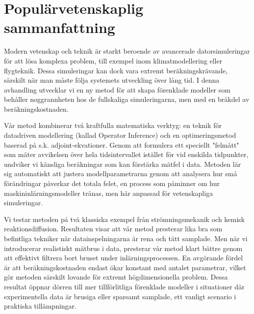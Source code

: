 

{\let\cleardoublepage\relax
 \let\clearpage\relax

 \newpage
 
 \chapter*{Populärvetenskaplig sammanfattning}

 \vspace{-1.5cm}

Modern vetenskap och teknik är starkt beroende av avancerade datorsimuleringar för att lösa komplexa problem, till exempel inom klimatmodellering eller flygteknik. Dessa simuleringar kan dock vara extremt beräkningskrävande, särskilt när man måste följa systemets utveckling över lång tid. I denna avhandling utvecklar vi en ny metod för att skapa förenklade modeller som behåller noggrannheten hos de fullskaliga simuleringarna, men med en bråkdel av beräkningskostnaden.

Vår metod kombinerar två kraftfulla matematiska verktyg: en teknik för datadriven modellering (kallad Operator Inference) och en optimeringsmetod baserad på s.k. adjoint-ekvationer. Genom att formulera ett speciellt "felmått" som mäter avvikelsen över hela tidsintervallet istället för vid enskilda tidpunkter, undviker vi känsliga beräkningar som kan förstärka mätfel i data. Metoden lär sig automatiskt att justera modellparametrarna genom att analysera hur små förändringar påverkar det totala felet, en process som påminner om hur maskininlärningsmodeller tränas, men här anpassad för vetenskapliga simuleringar.

Vi testar metoden på två klassiska exempel från strömningsmekanik och kemisk reaktionsdiffusion. Resultaten visar att vår metod presterar lika bra som befintliga tekniker när datainspelningarna är rena och tätt samplade. Men när vi introducerar realistiskt mätbrus i data, presterar vår metod klart bättre genom att effektivt filtrera bort bruset under inlärningsprocessen. En avgörande fördel är att beräkningskostnaden endast ökar konstant med antalet parametrar, vilket gör metoden särskilt lovande för extremt högdimensionella problem. Dessa resultat öppnar dörren till mer tillförlitliga förenklade modeller i situationer där experimentella data är brusiga eller sparsamt samplade, ett vanligt scenario i praktiska tillämpningar. 
 

}
